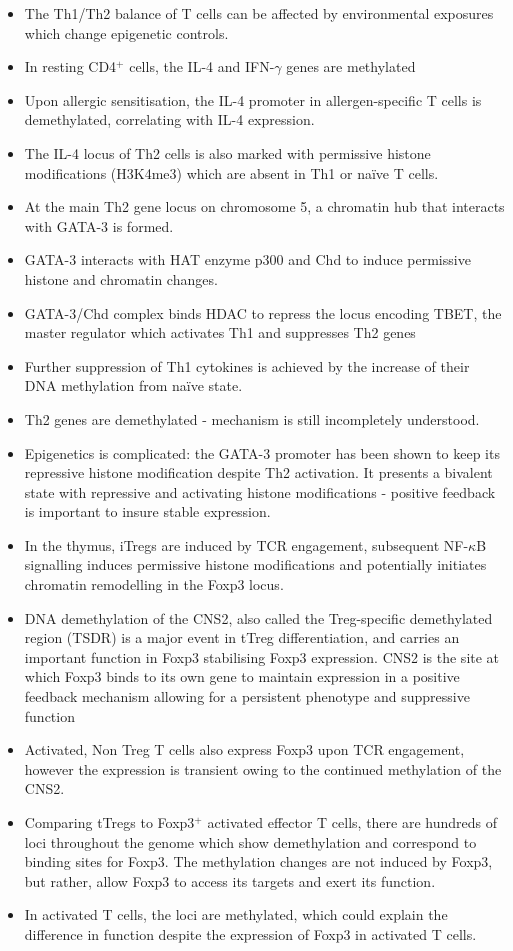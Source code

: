 \documentclass[12pt]{article}
\newcommand{\CDH}{CD4$^+$ } %
\newcommand{\IFNG}{IFN-$\gamma$ }
\newcommand{\NFKB}{NF-$\kappa$B }
\begin{document}
	\begin{itemize}
		\item The Th1/Th2 balance of T cells can be affected by environmental exposures which change epigenetic controls.
		\item In resting \CDH cells, the IL-4 and \IFNG genes are methylated 
		\item Upon allergic sensitisation, the IL-4 promoter in allergen-specific T cells is demethylated, correlating with IL-4 expression.
		\item The IL-4 locus of Th2 cells is also marked with permissive histone modifications (H3K4me3) which are absent in Th1 or na\"{i}ve T cells.
		\item At the main Th2 gene locus on chromosome 5, a chromatin hub that interacts with GATA-3 is formed.
		\item GATA-3 interacts with HAT enzyme p300 and Chd to induce permissive histone and chromatin changes.
		\item GATA-3/Chd complex binds HDAC to repress the locus encoding TBET, the master regulator which activates Th1 and suppresses Th2 genes
		\item Further suppression of Th1 cytokines is achieved by the increase of their DNA methylation from na\"{i}ve state. 
		\item Th2 genes are demethylated - mechanism is still incompletely understood.
		\item Epigenetics is complicated: the GATA-3 promoter has been shown to keep its repressive histone modification despite Th2 activation. It presents a bivalent state with repressive and activating histone modifications - positive feedback is important to insure stable expression.
		\item In the thymus, iTregs are induced by TCR engagement, subsequent \NFKB signalling induces permissive histone modifications and potentially initiates chromatin remodelling in the Foxp3 locus.
		\item DNA demethylation of the CNS2, also called the Treg-specific demethylated region (TSDR) is a major event in tTreg differentiation, and carries an important function in Foxp3 stabilising Foxp3 expression. CNS2 is the site at which Foxp3 binds to its own gene to maintain expression in a positive feedback mechanism allowing for a persistent phenotype and suppressive function
		\item Activated, Non Treg T cells also express Foxp3 upon TCR engagement, however the expression is transient owing to the continued methylation of the CNS2. 
		\item Comparing tTregs to Foxp3$^+$ activated effector T cells, there are hundreds of loci throughout the genome which show demethylation and correspond to binding sites for Foxp3. The methylation changes are not induced by Foxp3, but rather, allow Foxp3 to access its targets and exert its function. 
		\item In activated T cells, the loci are methylated, which could explain the difference in function despite the expression of Foxp3 in activated T cells.
	\end{itemize}
	
\end{document}
